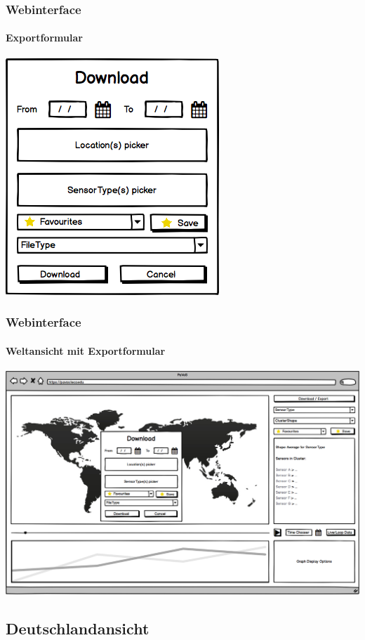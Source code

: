 \documentclass{beamer}
\begin{document}
\begin{frame}
	\frametitle{Webinterface}
	\framesubtitle{Exportformular}
	\centering
	\includegraphics[height=0.6\textheight]{gui/frontend/FrontGUIExportForm}
\end{frame}

\begin{frame}
	\frametitle{Webinterface}
	\framesubtitle{Weltansicht mit Exportformular}
	\centering
	\includegraphics[width=\linewidth]{gui/frontend/FrontGUIWorldWithExportForm}
\end{frame}

\subsection{Deutschlandansicht}
\end{document}
